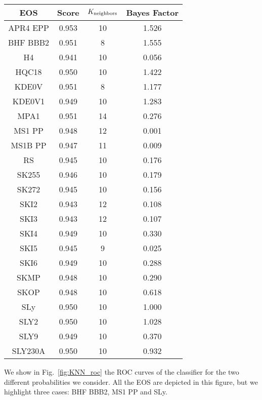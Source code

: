\begin{table}
    \centering
\begin{tabular}{cccc}
\hline
    EOS & Score & $K_{\rm neighbors}$ & Bayes Factor\\
    \hline 
    \hline
    APR4 EPP & 0.953 & 10 &  1.526 \\
    BHF BBB2 & 0.951 & 8  &  1.555 \\
    H4       & 0.941 & 10 &  0.056 \\
    HQC18    & 0.950 & 10 &  1.422 \\
    KDE0V    & 0.951 & 8  &  1.177 \\
    KDE0V1   & 0.949 & 10 &  1.283 \\
    MPA1     & 0.951 & 14 &  0.276 \\
    MS1 PP   & 0.948 & 12 &  0.001 \\
    MS1B PP  & 0.947 & 11 &  0.009 \\
    RS       & 0.945 & 10 &  0.176 \\
    SK255    & 0.946 & 10 &  0.179 \\
    SK272    & 0.945 & 10 &  0.156 \\
    SKI2     & 0.943 & 12 &  0.108 \\ 
    SKI3     & 0.943 & 12 &  0.107 \\
    SKI4     & 0.949 & 10 &  0.330 \\
    SKI5     & 0.945 & 9  &  0.025 \\
    SKI6     & 0.949 & 10 &  0.288 \\
    SKMP     & 0.948 & 10 &  0.290 \\
    SKOP     & 0.948 & 10 &  0.618 \\
    SLy      & 0.950 & 10 &  1.000 \\
    SLY2     & 0.950 & 10 &  1.028 \\
    SLY9     & 0.949 & 10 &  0.370 \\
    SLY230A  & 0.950 & 10 &  0.932 \\
    
\hline
\end{tabular}
    \caption{}
    \label{tab:KNN_CV}
\end{table}








We show in Fig.~\ref{fig:KNN_roc} the ROC curves of the classifier for the two different probabilities we consider. All the EOS are depicted in this figure, but we highlight three cases: BHF BBB2, MS1 PP and SLy.

